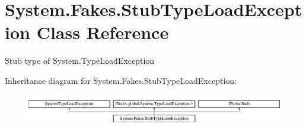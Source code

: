 \hypertarget{class_system_1_1_fakes_1_1_stub_type_load_exception}{\section{System.\-Fakes.\-Stub\-Type\-Load\-Exception Class Reference}
\label{class_system_1_1_fakes_1_1_stub_type_load_exception}
}


Stub type of System.\-Type\-Load\-Exception 


Inheritance diagram for System.\-Fakes.\-Stub\-Type\-Load\-Exception\-:\begin{figure}[H]
\begin{center}
\leavevmode
\includegraphics[height=1.408805cm]{class_system_1_1_fakes_1_1_stub_type_load_exception}
\end{center}
\end{figure}
